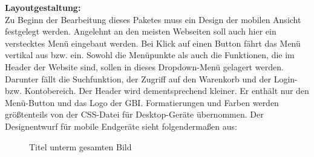 \newpage
\textbf{Layoutgestaltung:}\\
Zu Beginn der Bearbeitung dieses Paketes muss ein Design der mobilen Ansicht festgelegt werden. Angelehnt an den meisten Webseiten soll auch hier ein verstecktes Menü eingebaut werden. Bei Klick auf einen Button fährt das Menü vertikal aus bzw. ein. Sowohl die Menüpunkte als auch die Funktionen, die im Header der Website sind, sollen in dieses Dropdown-Menü gelagert werden. Darunter fällt die Suchfunktion, der Zugriff auf den Warenkorb und der Login- bzw. Kontobereich. Der Header wird dementsprechend kleiner. Er enthält nur den Menü-Button und das Logo der GBI.
Formatierungen und Farben werden größtenteils von der CSS-Datei für Desktop-Geräte übernommen. 
Der Designentwurf für mobile Endgeräte sieht folgendermaßen aus:

	
\begin{figure}
\caption{Titel unterm gesamten Bild}
\end{figure}

